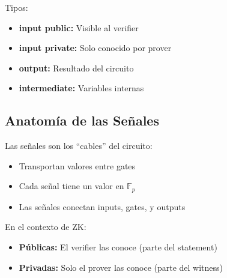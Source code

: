 \documentclass[11pt,a4paper,twoside,openright]{book}
\theoremstyle{definition}
\theoremstyle{plain}
\theoremstyle{remark}
\begin{document}
Tipos:
\begin{itemize}
    \item \textbf{input public:} Visible al verifier
    \item \textbf{input private:} Solo conocido por prover
    \item \textbf{output:} Resultado del circuito
    \item \textbf{intermediate:} Variables internas
\end{itemize}

\subsection{Anatomía de las Señales}

\begin{intuicion}
Las señales son los ``cables'' del circuito:
\begin{itemize}
    \item Transportan valores entre gates
    \item Cada señal tiene un valor en $\mathbb{F}_p$
    \item Las señales conectan inputs, gates, y outputs
\end{itemize}

En el contexto de ZK:
\begin{itemize}
    \item \textbf{Públicas:} El verifier las conoce (parte del statement)
    \item \textbf{Privadas:} Solo el prover las conoce (parte del witness)
\end{itemize}
\end{intuicion}
\end{document}
